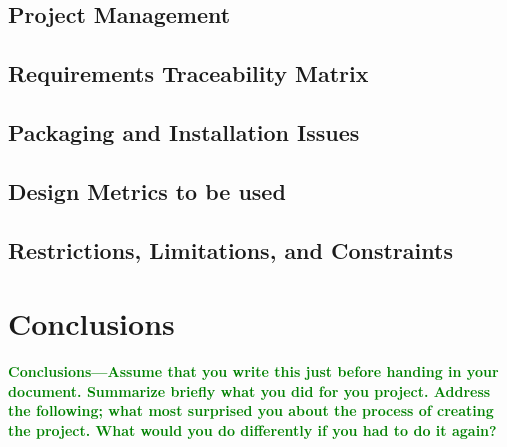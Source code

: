 \documentclass{article}
\numberwithin{equation}{section} %
\begin{document}
\subsection{Project Management}

\subsection{Requirements Traceability Matrix}

\subsection{Packaging and Installation Issues}

\subsection{Design Metrics to be used}

\subsection{Restrictions, Limitations, and Constraints}

\section{Conclusions}
\textcolor{green}{\bf Conclusions—Assume that you write this just before handing in your document. 
Summarize brieﬂy what you did for you project. Address the following; what most 
surprised you about the process of creating the project. What would you do 
differently if you had to do it again?}

\end{document}
